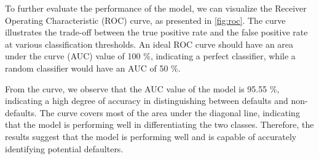 To further evaluate the performance of the model, we can visualize the Receiver Operating Characteristic (ROC) curve, as presented in \autoref{fig:roc}. The curve illustrates the trade-off between the true positive rate and the false positive rate at various classification thresholds. An ideal ROC curve should have an area under the curve (AUC) value of 100 \%, indicating a perfect classifier, while a random classifier would have an AUC of 50 \%.

From the curve, we observe that the AUC value of the model is 95.55 \%, indicating a high degree of accuracy in distinguishing between defaults and non-defaults. The curve covers most of the area under the diagonal line, indicating that the model is performing well in differentiating the two classes. Therefore, the results suggest that the model is performing well and is capable of accurately identifying potential defaulters.

